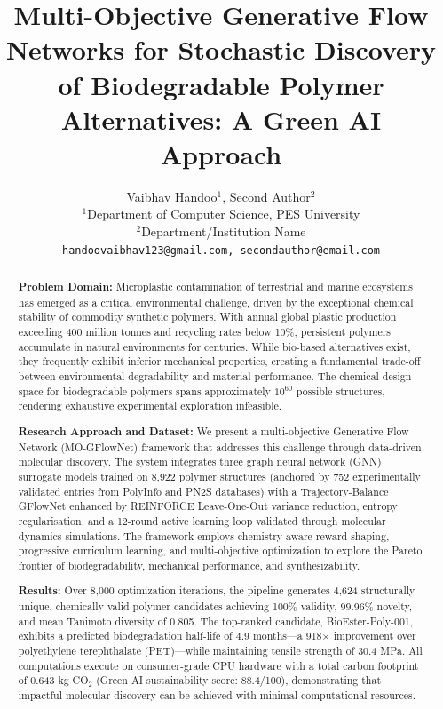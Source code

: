 \documentclass[twocolumn,10pt]{article}
\title{\textbf{Multi-Objective Generative Flow Networks for Stochastic Discovery of Biodegradable Polymer Alternatives: A Green AI Approach}}
\author{
  Vaibhav Handoo$^{1}$, Second Author$^{2}$ \\
  \small $^{1}$Department of Computer Science, PES University \\
  \small $^{2}$Department/Institution Name \\
  \small \texttt{handoovaibhav123@gmail.com, secondauthor@email.com}
}
\date{}
\begin{document}
\raggedbottom
\maketitle

\begin{abstract}


\noindent\textbf{Problem Domain:} 
Microplastic contamination of terrestrial and marine ecosystems has emerged as a critical environmental challenge, driven by the exceptional chemical stability of commodity synthetic polymers. With annual global plastic production exceeding 400 million tonnes and recycling rates below 10\%, persistent polymers accumulate in natural environments for centuries. While bio-based alternatives exist, they frequently exhibit inferior mechanical properties, creating a fundamental trade-off between environmental degradability and material performance. The chemical design space for biodegradable polymers spans approximately $10^{60}$ possible structures, rendering exhaustive experimental exploration infeasible.

\noindent\textbf{Research Approach and Dataset:}
We present a multi-objective Generative Flow Network (MO-GFlowNet) framework that addresses this challenge through data-driven molecular discovery. The system integrates three graph neural network (GNN) surrogate models trained on 8,922 polymer structures (anchored by 752 experimentally validated entries from PolyInfo and PN2S databases) with a Trajectory-Balance GFlowNet enhanced by REINFORCE Leave-One-Out variance reduction, entropy regularisation, and a 12-round active learning loop validated through molecular dynamics simulations. The framework employs chemistry-aware reward shaping, progressive curriculum learning, and multi-objective optimization to explore the Pareto frontier of biodegradability, mechanical performance, and synthesizability.

\noindent\textbf{Results:}
Over 8,000 optimization iterations, the pipeline generates 4,624 structurally unique, chemically valid polymer candidates achieving 100\% validity, 99.96\% novelty, and mean Tanimoto diversity of 0.805. The top-ranked candidate, BioEster-Poly-001, exhibits a predicted biodegradation half-life of 4.9 months—a 918$\times$ improvement over polyethylene terephthalate (PET)—while maintaining tensile strength of 30.4 MPa. All computations execute on consumer-grade CPU hardware with a total carbon footprint of 0.643 kg CO$_2$ (Green AI sustainability score: 88.4/100), demonstrating that impactful molecular discovery can be achieved with minimal computational resources.

\end{abstract}
\end{document}
